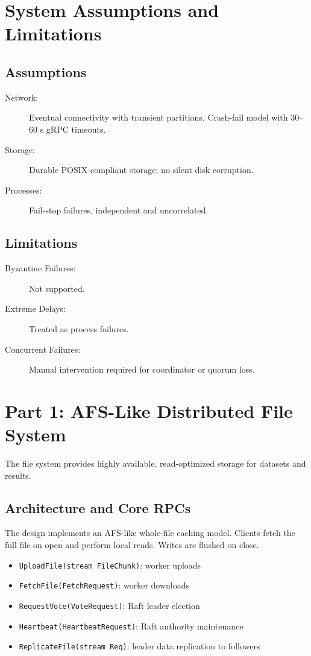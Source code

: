 \documentclass[11pt, a4paper]{article}
\begin{document}
\section{System Assumptions and Limitations}

\subsection{Assumptions}
\begin{description}
    \item[Network:] Eventual connectivity with transient partitions. Crash-fail model with 30–60 s gRPC timeouts.
    \item[Storage:] Durable POSIX-compliant storage; no silent disk corruption.
    \item[Processes:] Fail-stop failures, independent and uncorrelated.
\end{description}

\subsection{Limitations}
\begin{description}
    \item[Byzantine Failures:] Not supported.
    \item[Extreme Delays:] Treated as process failures.
    \item[Concurrent Failures:] Manual intervention required for coordinator or quorum loss.
\end{description}

\section{Part 1: AFS-Like Distributed File System}

The file system provides highly available, read-optimized storage for datasets and results.

\subsection{Architecture and Core RPCs}

The design implements an AFS-like whole-file caching model. Clients fetch the full file on open and perform local reads. Writes are flushed on close.

\begin{itemize}
    \item \texttt{UploadFile(stream FileChunk)}: worker uploads
    \item \texttt{FetchFile(FetchRequest)}: worker downloads
    \item \texttt{RequestVote(VoteRequest)}: Raft leader election
    \item \texttt{Heartbeat(HeartbeatRequest)}: Raft authority maintenance
    \item \texttt{ReplicateFile(stream Req)}: leader data replication to followers
\end{itemize}
\end{document}
